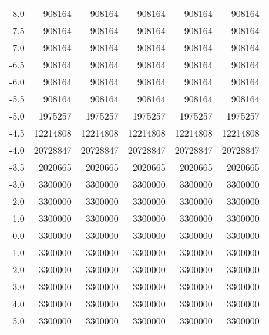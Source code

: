 \begin{samepage}
\begin{center}
{\begin{tabular}{rrrrrr}
	\hline
	-8.0 &   908164 &   908164 &   908164 &   908164 &   908164 \\
	-7.5 &   908164 &   908164 &   908164 &   908164 &   908164 \\
	-7.0 &   908164 &   908164 &   908164 &   908164 &   908164 \\
	-6.5 &   908164 &   908164 &   908164 &   908164 &   908164 \\
	-6.0 &   908164 &   908164 &   908164 &   908164 &   908164 \\
	-5.5 &   908164 &   908164 &   908164 &   908164 &   908164 \\
	\hline
	-5.0 &  1975257 &  1975257 &  1975257 &  1975257 &  1975257 \\
	-4.5 & 12214808 & 12214808 & 12214808 & 12214808 & 12214808 \\
	-4.0 & 20728847 & 20728847 & 20728847 & 20728847 & 20728847 \\
	-3.5 &  2020665 &  2020665 &  2020665 &  2020665 &  2020665 \\
	\hline
	-3.0 &  3300000 &  3300000 &  3300000 &  3300000 &  3300000 \\
	-2.0 &  3300000 &  3300000 &  3300000 &  3300000 &  3300000 \\
	-1.0 &  3300000 &  3300000 &  3300000 &  3300000 &  3300000 \\
	0.0 &  3300000 &  3300000 &  3300000 &  3300000 &  3300000 \\
	1.0 &  3300000 &  3300000 &  3300000 &  3300000 &  3300000 \\
	2.0 &  3300000 &  3300000 &  3300000 &  3300000 &  3300000 \\
	3.0 &  3300000 &  3300000 &  3300000 &  3300000 &  3300000 \\
	4.0 &  3300000 &  3300000 &  3300000 &  3300000 &  3300000 \\
	5.0 &  3300000 &  3300000 &  3300000 &  3300000 &  3300000 \\
	\bottomrule
\end{tabular}
}
\end{center}
\end{samepage}
\clearpage